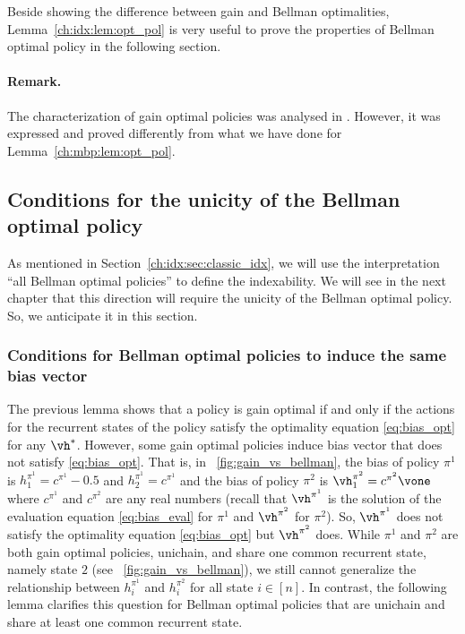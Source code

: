 Beside showing the difference between gain and Bellman optimalities, Lemma~\ref{ch:idx:lem:opt_pol} is very useful to prove the properties of Bellman optimal policy in the following section.

\paragraph{Remark.} The characterization of gain optimal policies was analysed in \cite{puterman2014markov, schweitzer1978functional}.
However, it was expressed and proved differently from what we have done for Lemma~\ref{ch:mbp:lem:opt_pol}.

\subsection{Conditions for the unicity of the Bellman optimal policy}
\label{ch:idx:ssec:unicity_bell}

As mentioned in Section~\ref{ch:idx:sec:classic_idx}, we will use the interpretation ``all Bellman optimal policies'' to define the indexability.
We will see in the next chapter that this direction will require the unicity of the Bellman optimal policy.
So, we anticipate it in this section.

\subsubsection{Conditions for Bellman optimal policies to induce the same bias vector}

The previous lemma shows that a policy is gain optimal if and only if the actions for the recurrent states of the policy satisfy the optimality equation \eqref{eq:bias_opt} for any $\vh^*$.
However, some gain optimal policies induce bias vector that does not satisfy \eqref{eq:bias_opt}.
That is, in \figurename~\ref{fig:gain_vs_bellman}, the bias of policy $\pi^1$ is $h^{\pi^1}_1=c^{\pi^1}-0.5$ and $h^{\pi^1}_2=c^{\pi^1}$ and the bias of policy $\pi^2$ is $\vh^{\pi^2}_1=c^{\pi^2}\vone$ where $c^{\pi^1}$ and $c^{\pi^2}$ are any real numbers (recall that $\vh^{\pi^1}$ is the solution of the evaluation equation \eqref{eq:bias_eval} for $\pi^1$ and $\vh^{\pi^2}$ for $\pi^2$).
So, $\vh^{\pi^1}$ does not satisfy the optimality equation \eqref{eq:bias_opt} but $\vh^{\pi^2}$ does.
While $\pi^1$ and $\pi^2$ are both gain optimal policies, unichain, and share one common recurrent state, namely state $2$ (see \figurename~\ref{fig:gain_vs_bellman}), we still cannot generalize the relationship between $h^{\pi^1}_i$ and $h^{\pi^2}_i$ for all state $i\in[n]$.
In contrast, the following lemma clarifies this question for Bellman optimal policies that are unichain and share at least one common recurrent state.

